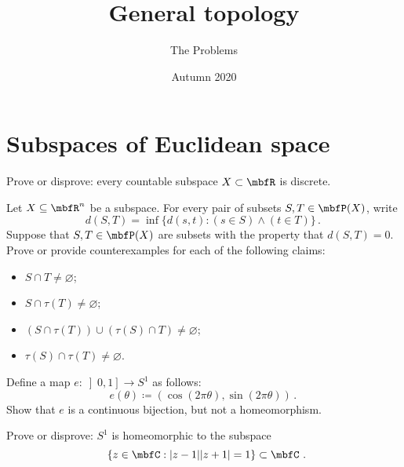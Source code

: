 \documentclass[a4paper,twoside,nols,nobib]{tufte-handout}
\title{General topology}
\author{The Problems}
\date{Autumn 2020}
\begin{document}
\maketitle

\section*{Subspaces of Euclidean space}

\begin{Problem}
	\noindent
	Prove or disprove: 
	every countable subspace $X \subset \RR$ is discrete.%
\end{Problem}


\begin{Problem}
	\noindent
	Let $X \subseteq \RR^n$ be a subspace.
	For every pair of subsets $S, T \in \PP(X)$, write
	\[
		d(S,T) = \inf\{ d(s,t) : (s \in S) \wedge (t \in T) \} \period
	\]
	Suppose that $S, T \in \PP(X)$ are subsets with the property that $d(S,T) = 0$.
	Prove or provide counterexamples for each of the following claims:
	\begin{itemize}
		\item $S \cap T \neq \varnothing$;
		\item $S \cap \tau(T) \neq \varnothing$;
		\item $(S \cap \tau(T)) \cup (\tau(S) \cap T) \neq \varnothing$;
		\item $\tau(S) \cap \tau(T) \neq \varnothing$. 
	\end{itemize}
\end{Problem}

\begin{Problem}
	\noindent
	Define a map $e \colon \left]0, 1\right] \to S^1$ as follows:
	\[
		e(\theta) \coloneq (\cos(2\pi\theta), \sin(2\pi\theta)) \period
	\]
	Show that $e$ is a continuous bijection, but not a homeomorphism.
\end{Problem}


\begin{Problem}
	\noindent
	Prove or disprove: $S^1$ is homeomorphic to the subspace
	\[
		\{ z \in \CC : |z-1||z+1| = 1 \} \subset \CC \period
	\]
\end{Problem}
\end{document}
